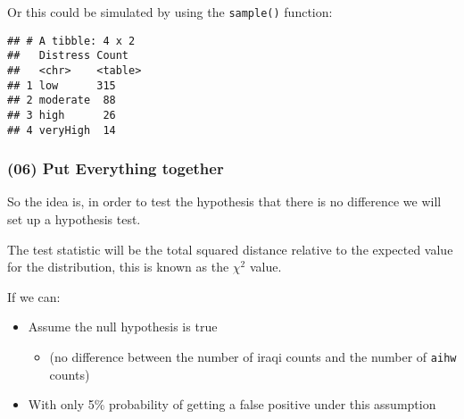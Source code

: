 \documentclass[
]{article}
\newenvironment{Shaded}{\begin{snugshade}}{\end{snugshade}}
\newcommand{\DataTypeTok}[1]{\textcolor[rgb]{0.13,0.29,0.53}{#1}}
\newcommand{\DecValTok}[1]{\textcolor[rgb]{0.00,0.00,0.81}{#1}}
\newcommand{\KeywordTok}[1]{\textcolor[rgb]{0.13,0.29,0.53}{\textbf{#1}}}
\newcommand{\NormalTok}[1]{#1}
\newcommand{\OperatorTok}[1]{\textcolor[rgb]{0.81,0.36,0.00}{\textbf{#1}}}
\newcommand{\OtherTok}[1]{\textcolor[rgb]{0.56,0.35,0.01}{#1}}
\newcommand{\StringTok}[1]{\textcolor[rgb]{0.31,0.60,0.02}{#1}}
\providecommand{\tightlist}{%
  \setlength{\itemsep}{0pt}\setlength{\parskip}{0pt}}
\begin{document}
Or this could be simulated by using the \texttt{sample()} function:

\begin{Shaded}
\end{Shaded}

\begin{verbatim}
## # A tibble: 4 x 2
##   Distress Count  
##   <chr>    <table>
## 1 low      315    
## 2 moderate  88    
## 3 high      26    
## 4 veryHigh  14
\end{verbatim}

\hypertarget{put-everything-together}{%
\subsubsection{(06) Put Everything
together}\label{put-everything-together}}

So the idea is, in order to test the hypothesis that there is no
difference we will set up a hypothesis test.

The test statistic will be the total squared distance relative to the
expected value for the distribution, this is known as the \(\chi ^2\)
value.

If we can:

\begin{itemize}
\tightlist
\item
  Assume the null hypothesis is true

  \begin{itemize}
  \tightlist
  \item
    (no difference between the number of iraqi counts and the number of
    \texttt{aihw} counts)
  \end{itemize}
\item
  With only 5\% probability of getting a false positive under this
  assumption
\end{itemize}
\end{document}
